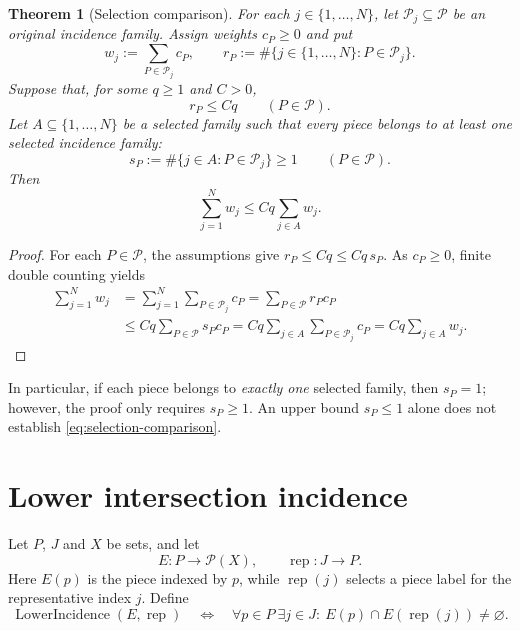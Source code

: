 \documentclass[11pt, letterpaper]{nyjm}
\newtheorem{theorem}{Theorem}[section]
\newcommand{\calP}{\mathcal{P}}
\newcommand{\rep}{\operatorname{rep}}
\newcommand{\LowerIncidence}{\operatorname{LowerIncidence}}
\begin{document}
\begin{theorem}[Selection comparison]\label{thm:comparison}
	For each $j\in\{1,\ldots,N\}$, let $\calP_j\subseteq\calP$ be an
	original incidence family. Assign weights $c_P\geq 0$ and put
	\[
	w_j:=\sum_{P\in\calP_j}c_P,
	\qquad
	r_P:=\#\bigl\{j\in\{1,\ldots,N\}:P\in\calP_j\bigr\}.
	\]
	Suppose that, for some $q\geq1$ and $C>0$,
	\[
	r_P\leq Cq\qquad(P\in\calP).
	\]
	Let $A\subseteq\{1,\ldots,N\}$ be a selected family such that every
	piece belongs to at least one selected incidence family:
	\[
	s_P:=\#\{j\in A:P\in\calP_j\}\geq1
	\qquad(P\in\calP).
	\]
	Then
	\begin{equation}\label{eq:selection-comparison}
		\boxed{\displaystyle
			\sum_{j=1}^{N}w_j\leq Cq\sum_{j\in A}w_j.}
	\end{equation}
\end{theorem}

\begin{proof}
	For each $P\in\calP$, the assumptions give
	$r_P\leq Cq\leq Cq\,s_P$. As $c_P\geq0$, finite double counting yields
	\begin{align*}
		\sum_{j=1}^{N}w_j
		&=\sum_{j=1}^{N}\sum_{P\in\calP_j}c_P
		=\sum_{P\in\calP}r_Pc_P\\
		&\leq Cq\sum_{P\in\calP}s_Pc_P
		=Cq\sum_{j\in A}\sum_{P\in\calP_j}c_P
		=Cq\sum_{j\in A}w_j.
	\end{align*}
\end{proof}

\noindent
In particular, if each piece belongs to \emph{exactly one} selected
family, then $s_P=1$; however, the proof only requires $s_P\geq1$.
An upper bound $s_P\leq1$ alone does not establish
\eqref{eq:selection-comparison}.

\section{Lower intersection incidence}

Let $P$, $J$ and $X$ be sets, and let
\[
E:P\longrightarrow\mathcal P(X),\qquad
\rep:J\longrightarrow P.
\]
Here $E(p)$ is the piece indexed by $p$, while $\rep(j)$ selects a
piece label for the representative index $j$. Define
\begin{equation}\label{eq:lower-incidence}
	\LowerIncidence(E,\rep)
	\quad\Longleftrightarrow\quad
	\forall p\in P\ \exists j\in J:\ 
	E(p)\cap E(\rep(j))\ne\varnothing.
\end{equation}
\end{document}
